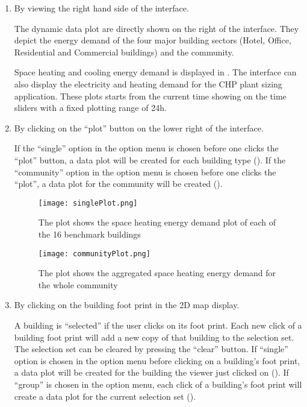 \begin{enumerate}[1)]
\item By viewing the right hand side of the interface.

  The dynamic data plot are directly shown on the right of the
  interface. They depict the energy demand of the four major building
  sectors (Hotel, Office, Residential and Commercial buildings) and
  the community.

  Space heating and cooling energy demand is displayed in
  . The interface can also display the
  electricity and heating demand for the CHP plant sizing
  application. These plots starts from the current time showing on the
  time sliders with a fixed plotting range of 24h.

\item By clicking on the ``plot'' button on the lower right of the
  interface.

  If the ``single'' option in the option menu is chosen before one
  clicks the ``plot'' button, a data plot will be created for each
  building type (). If the ``community'' option
  in the option menu is chosen before one clicks the ``plot'', a data
  plot for the community will be created ().

  \begin{figure}[h!]
    \centering
    \texttt{[image: singlePlot.png]}
    \caption[Single Plots of 16 Building Types]{The plot shows the
      space heating energy demand plot of each of the 16 benchmark
      buildings}
    \label{fig:singlePlot}
  \end{figure}

  \begin{figure}[h!]
    \centering
    \texttt{[image: communityPlot.png]}
    \caption[Community Plot]{The plot shows the aggregated space
      heating energy demand for the whole community}
    \label{fig:communityPlot}
  \end{figure}

\item By clicking on the building foot print in the 2D map display.

  A building is ``selected'' if the user clicks on its foot
  print. Each new click of a building foot print will add a new copy
  of that building to the selection set. The selection set can be
  cleared by pressing the ``clear'' button. If ``single'' option is
  chosen in the option menu before clicking on a building's foot
  print, a data plot will be created for the building the viewer just
  clicked on (). If ``group'' is chosen in the
  option menu, each click of a building's foot print will create a
  data plot for the current selection set ().
  

\end{enumerate}
